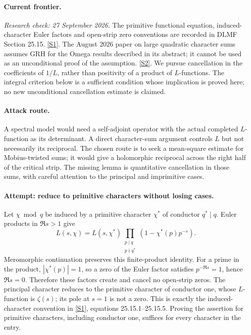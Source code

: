 \documentclass[11pt,a4paper]{article}
\newcommand{\sref}[2]{\hyperlink{source:#1:#2}{[S#2]}}
\begin{document}
\paragraph{Current frontier.}
\textit{Research check: 27 September 2026.}
The primitive functional equation, induced-character Euler factors and
open-strip zero conventions are recorded in DLMF Section 25.15.
\sref{30006676}{1}. The August 2026 paper on large quadratic character sums
assumes GRH for the Omega results described in its abstract; it cannot
be used as an unconditional proof of the assumption. \sref{30006676}{2}.
We pursue cancellation in the coefficients of $1/L$, rather than
positivity of a product of $L$-functions. The integral criterion below
is a sufficient condition whose implication is proved here; no new
unconditional cancellation estimate is claimed.

\paragraph{Attack route.}
A spectral model would need a self-adjoint operator with the actual
completed $L$-function as its determinant. A direct character-sum argument
controls $L$ but not necessarily its reciprocal. The chosen route is to
seek a mean-square estimate for Mobius-twisted sums; it would give a
holomorphic reciprocal across the right half of the critical strip.
The missing lemma is quantitative cancellation in those sums, with
careful attention to the principal and imprimitive cases.

\paragraph{Attempt: reduce to primitive characters without losing cases.}
Let $\chi\bmod q$ be induced by a primitive character $\chi^*$ of
conductor $q^*\mid q$. Euler products in $\Re s>1$ give
\[
 L(s,\chi)=L(s,\chi^*)
       \prod_{\substack{p\mid q\\p\nmid q^*}}
                  (1-\chi^*(p)p^{-s}). \tag{9.1}
\]
Meromorphic continuation preserves this finite-product identity.
For a prime in the product, $|\chi^*(p)|=1$, so a zero of the Euler
factor satisfies $p^{-\Re s}=1$, hence $\Re s=0$.
Therefore these factors create and cancel no open-strip zeros.
The principal character reduces to the primitive character of conductor
one, whose $L$-function is $\zeta(s)$; its pole at $s=1$ is not a zero.
This is exactly the induced-character convention in \sref{30006676}{1},
equations 25.15.1--25.15.5. Proving the assertion for primitive characters,
including conductor one, suffices for every character in the entry.
\end{document}
